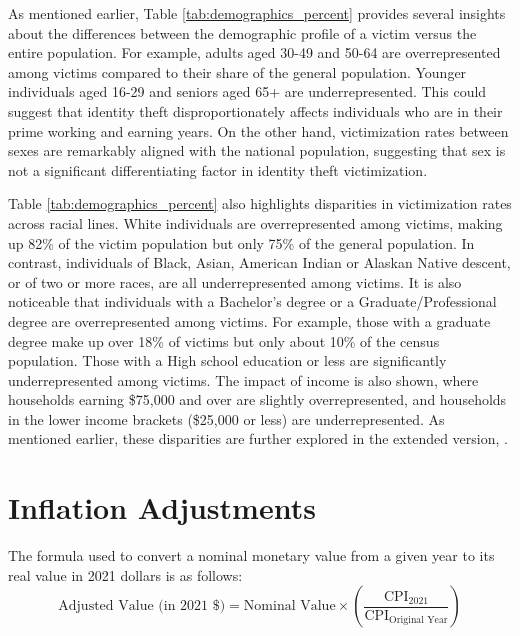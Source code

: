 As mentioned earlier, Table \ref{tab:demographics_percent} provides several insights about the differences between the demographic profile of a victim versus the entire population. For example, adults aged 30-49 and 50-64 are overrepresented among victims compared to their share of the general population. Younger individuals aged 16-29 and seniors aged 65+ are underrepresented. This could suggest that identity theft disproportionately affects individuals who are in their prime working and earning years. On the other hand, victimization rates between sexes are remarkably aligned with the national population, suggesting that sex is not a significant differentiating factor in identity theft victimization. 

Table \ref{tab:demographics_percent} also highlights disparities in victimization rates across racial lines. White individuals are overrepresented among victims, making up 82\% of the victim population but only 75\% of the general population. In contrast, individuals of Black, Asian, American Indian or Alaskan Native descent, or of two or more races, are all underrepresented among victims. It is also noticeable that individuals with a Bachelor's degree or a Graduate/Professional degree are overrepresented among victims. For example, those with a graduate degree make up over 18\% of victims but only about 10\% of the census population. Those with a High school education or less are significantly underrepresented among victims. The impact of income is also shown, where households earning \$75,000 and over are slightly overrepresented, and  households in the lower income brackets (\$25,000 or less) are underrepresented. As mentioned earlier, these disparities are further explored in the extended version, \cite{Anonymous2026SocialCostExtended}.








\section{Inflation Adjustments}
\label{app:inflation}
The formula used to convert a nominal monetary value from a given year to its real value in 2021 dollars is as follows:
\begin{equation}
\label{eq:inflation_adjustment}
\text{Adjusted Value (in 2021 \$)} = \text{Nominal Value} \times \left( \frac{\text{CPI}_{2021}}{\text{CPI}_{\text{Original Year}}} \right)
\end{equation}

